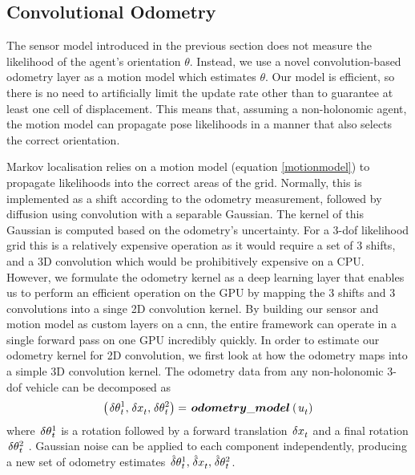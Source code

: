 \documentclass[letterpaper, 10 pt, conference]{ieeeconf}  %
\begin{document}
\subsection{Convolutional Odometry}\label{conv-odom}
The sensor model introduced in the previous section does not measure the likelihood of the agent's orientation \ensuremath{\theta}.
Instead, we use a novel convolution-based odometry layer as a motion model which estimates \ensuremath{\theta}.
Our model is efficient, so there is no need to artificially limit the update rate other than to guarantee at least one cell of displacement.
This means that, assuming a non-holonomic agent, the motion model can propagate pose likelihoods in a manner that also selects the correct orientation.

Markov localisation relies on a motion model (equation \ref{motionmodel}) to propagate likelihoods into the correct areas of the grid.
Normally, this is implemented as a shift according to the odometry measurement, followed by diffusion using convolution with a separable Gaussian.
The kernel of this Gaussian is computed based on the odometry's uncertainty.
For a 3-\ac{dof} likelihood grid this is a relatively expensive operation as it would require a set of 3 shifts, and a 3D convolution which would be prohibitively expensive on a CPU.
However, we formulate the odometry kernel as a deep learning layer that enables us to perform an efficient operation on the GPU by mapping the 3 shifts and 3 convolutions into a singe 2D convolution kernel.
By building our sensor and motion model as custom layers on a \ac{cnn}, the entire framework can operate in a single forward pass on one GPU incredibly quickly.
In order to estimate our odometry kernel for 2D convolution, we first look at how the odometry maps into a simple 3D convolution kernel.
The odometry data from any non-holonomic 3-\ac{dof} vehicle can be decomposed as 
\begin{equation}
\mypar{\sca{}{}{\delta\theta}{t}{1}, \sca{}{}{\delta x}{t}{},  \sca{}{}{\delta\theta}{t}{2}} = \easyfunc{odometry\_model}{\odom{\mytime}{}}
\end{equation}
where \ensuremath{\sca{}{}{\delta\theta}{t}{1}} is a rotation followed by a forward translation \ensuremath{\sca{}{}{\delta x}{t}{}} and a final rotation \ensuremath{\sca{}{}{\delta\theta}{t}{2}} \cite{Thrun2006rm}.
Gaussian noise can be applied to each component independently, producing a new set of odometry estimates \ensuremath{\sca{}{}{\hat{\delta}\theta}{t}{1}, \sca{}{}{\hat{\delta} x}{t}{}, \sca{}{}{\hat{\delta}\theta}{t}{2}}.
\end{document}
